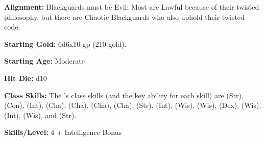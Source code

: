 


\textbf{Alignment:} Blackguards must be Evil; Most are Lawful because of their twisted philosophy, but there are Chaotic Blackguards who also uphold their twisted code.

\textbf{Starting Gold:} 6d6x10 gp (210 gold).

\textbf{Starting Age:} Moderate

\textbf{Hit Die:} d10

\textbf{Class Skills:} The \currentclassname{}'s class skills (and the key ability for each skill) are  (Str),  (Con),  (Int),  (Cha),  (Cha),  (Cha),  (Cha),  (Str),  (Int),  (Wis),  (Wis),  (Dex),  (Wis),  (Int),  (Wis), and  (Str).

\textbf{Skills/Level:} 4 + Intelligence Bonus

\goodbab{}
\goodfor{}
\poorref{}
\goodwil{}

